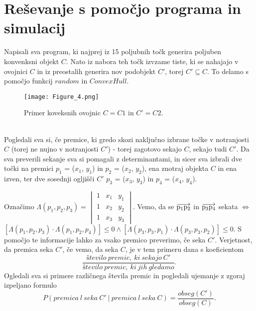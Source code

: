 \documentclass[a4paper,12pt]{article}
\begin{document}
\section{Reševanje s pomočjo programa in simulacij}
Napisali sva program, ki najprej iz 15 poljubnih točk generira poljuben konvenksni objekt $C$. Nato iz nabora teh točk izvzame tiste, ki se nahajajo v ovojnici $C$ in iz preostalih generira nov podobjekt $C'$, torej $C' \subseteq C$. To delamo s pomočjo funkcij $random$ in $ConvexHull$.
\begin{figure}[h!]
	\begin{center}
		\texttt{[image: Figure\_4.png]}
		\caption{Primer koveksnih ovojnic $C=C1$ in $C'=C2$.}
	\end{center}
\end{figure}\\
Pogledali sva si, če  premice, ki gredo skozi naključno izbrane točke v notranjosti $C$ (torej ne nujno v notranjosti $C'$) - torej zagotovo sekajo $C$, sekajo tudi $C'$.
Da sva preverili sekanje sva si pomagali z determinantami, in sicer sva izbrali dve točki na premici $p_1$ = ($x_1$, $y_1$) in $p_2$ = ($x_2$, $y_2$), ena znotraj objekta $C$ in ena izven, ter dve sosednji ogljišči $C'$ $p_3$ = ($x_3$, $y_3$) in $p_4$ = ($x_4$, $y_4$).
\begin{center}
\end{center}
Označimo $\Lambda(p_1,p_2,p_3) = \begin{vmatrix}
     1 & x_{1} & y_{1}\\ 
     1 & x_{2} & y_{2}\\
     1 & x_{3} & y_{3} 
\end{vmatrix}$. Vemo, da se $\overrightarrow{\rm p_1p_2}$ in $\overrightarrow{\rm p_3p_4}$ sekata $\Leftrightarrow$ \\ $[\Lambda(p_1,p_2,p_3)\cdot\Lambda(p_1,p_2,p_4)]\leq 0  \land 
[\Lambda(p_3,p_3,p_1)\cdot\Lambda(p_3,p_3,p_2)]\leq 0$.
S pomočjo te informacije lahko za vsako premico preverimo, če seka $C'$.
Verjetnost, da premica seka $C'$, če vemo, da seka $C$, je v tem primeru dana s koeficientom $$\frac{število\ premic,\ ki\ sekajo\ C'}{število\ premic,\ ki\ jih\ gledamo}.$$
Ogledali sva si primere različnega števila premic in pogledali ujemanje z zgoraj izpeljano formulo $$P(premica\ l\ seka\ C'\ |\ premica\ l\ seka\ C)=\frac{obseg(C')}{obseg(C)}.$$
\end{document}

